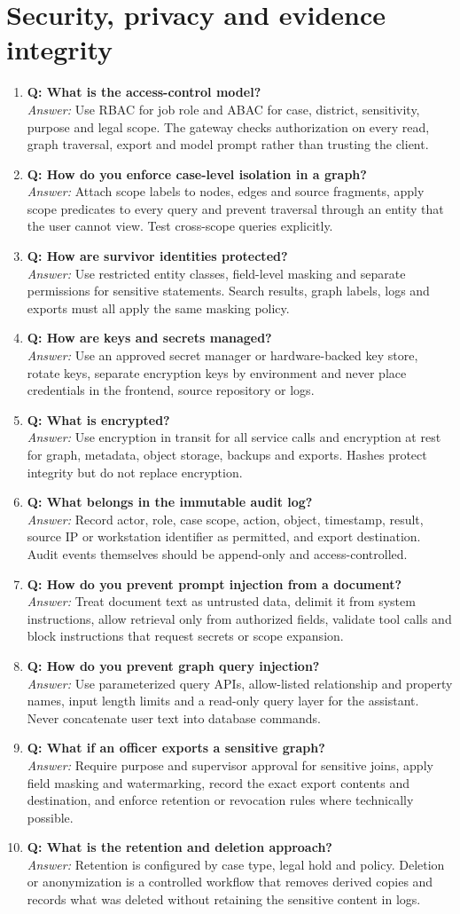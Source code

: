 \documentclass[10pt,a4paper]{article}
\newcommand{\qa}[2]{\item \textbf{\color{navy}Q: #1}\\[-1pt]{\color{coral}\textit{Answer:}} #2}
\begin{document}
\section{Security, privacy and evidence integrity}
\begin{enumerate}[resume]
\qa{What is the access-control model?}{Use RBAC for job role and ABAC for case, district, sensitivity, purpose and legal scope. The gateway checks authorization on every read, graph traversal, export and model prompt rather than trusting the client.}
\qa{How do you enforce case-level isolation in a graph?}{Attach scope labels to nodes, edges and source fragments, apply scope predicates to every query and prevent traversal through an entity that the user cannot view. Test cross-scope queries explicitly.}
\qa{How are survivor identities protected?}{Use restricted entity classes, field-level masking and separate permissions for sensitive statements. Search results, graph labels, logs and exports must all apply the same masking policy.}
\qa{How are keys and secrets managed?}{Use an approved secret manager or hardware-backed key store, rotate keys, separate encryption keys by environment and never place credentials in the frontend, source repository or logs.}
\qa{What is encrypted?}{Use encryption in transit for all service calls and encryption at rest for graph, metadata, object storage, backups and exports. Hashes protect integrity but do not replace encryption.}
\qa{What belongs in the immutable audit log?}{Record actor, role, case scope, action, object, timestamp, result, source IP or workstation identifier as permitted, and export destination. Audit events themselves should be append-only and access-controlled.}
\qa{How do you prevent prompt injection from a document?}{Treat document text as untrusted data, delimit it from system instructions, allow retrieval only from authorized fields, validate tool calls and block instructions that request secrets or scope expansion.}
\qa{How do you prevent graph query injection?}{Use parameterized query APIs, allow-listed relationship and property names, input length limits and a read-only query layer for the assistant. Never concatenate user text into database commands.}
\qa{What if an officer exports a sensitive graph?}{Require purpose and supervisor approval for sensitive joins, apply field masking and watermarking, record the exact export contents and destination, and enforce retention or revocation rules where technically possible.}
\qa{What is the retention and deletion approach?}{Retention is configured by case type, legal hold and policy. Deletion or anonymization is a controlled workflow that removes derived copies and records what was deleted without retaining the sensitive content in logs.}
\end{enumerate}
\end{document}
